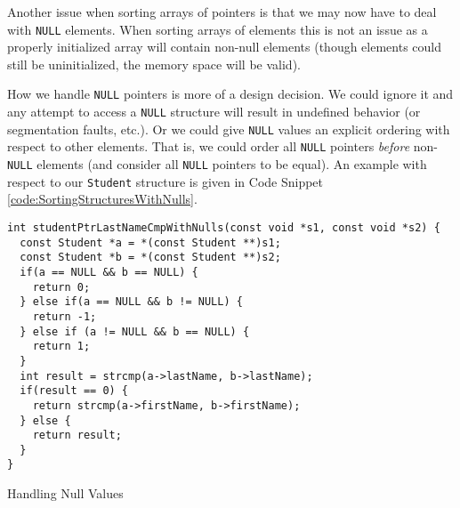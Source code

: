 Another issue when sorting arrays of pointers is that we may now 
have to deal with \texttt{NULL} elements.  When sorting 
arrays of elements this is not an issue as a properly initialized 
array will contain non-null elements (though elements could still
be uninitialized, the memory space will be valid).

How we handle \texttt{NULL} pointers is more of a design 
decision.  We could ignore it and any attempt to access a 
\texttt{NULL} structure will result in undefined
behavior (or segmentation faults, etc.).  Or we could give 
\texttt{NULL} values an explicit ordering with respect to 
other elements.  That is, we could order all \texttt{NULL}
pointers \emph{before} non-\texttt{NULL} elements (and consider 
all \texttt{NULL} pointers to be equal).  An example with respect 
to our \texttt{Student} structure is given in Code Snippet 
\ref{code:SortingStructuresWithNulls}.

\begin{listing}[!h]
\begin{verbatim}
int studentPtrLastNameCmpWithNulls(const void *s1, const void *s2) {
  const Student *a = *(const Student **)s1;
  const Student *b = *(const Student **)s2;
  if(a == NULL && b == NULL) {
    return 0;
  } else if(a == NULL && b != NULL) {
    return -1;
  } else if (a != NULL && b == NULL) {
    return 1;
  }
  int result = strcmp(a->lastName, b->lastName);
  if(result == 0) {
    return strcmp(a->firstName, b->firstName);
  } else {
    return result;
  }
}
\end{verbatim}
\caption{Handling Null Values}
\label{code:SortingStructuresWithNulls}
\end{listing}

